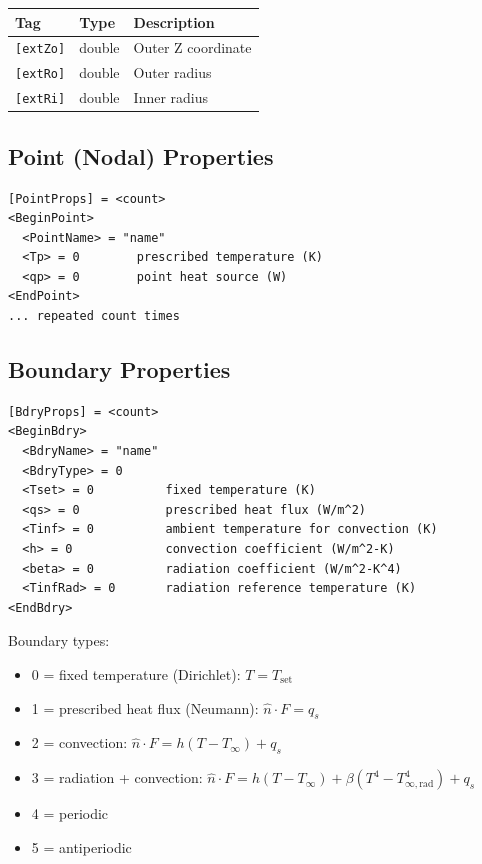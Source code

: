 \documentclass[11pt]{article}
\begin{document}
\begin{longtable}{llp{8cm}}
\toprule
Tag & Type & Description \\
\midrule
\verb|[extZo]| & double & Outer Z coordinate \\
\verb|[extRo]| & double & Outer radius \\
\verb|[extRi]| & double & Inner radius \\
\bottomrule
\end{longtable}

\subsection{Point (Nodal) Properties}

\begin{lstlisting}
[PointProps] = <count>
<BeginPoint>
  <PointName> = "name"
  <Tp> = 0        prescribed temperature (K)
  <qp> = 0        point heat source (W)
<EndPoint>
... repeated count times
\end{lstlisting}

\subsection{Boundary Properties}

\begin{lstlisting}
[BdryProps] = <count>
<BeginBdry>
  <BdryName> = "name"
  <BdryType> = 0
  <Tset> = 0          fixed temperature (K)
  <qs> = 0            prescribed heat flux (W/m^2)
  <Tinf> = 0          ambient temperature for convection (K)
  <h> = 0             convection coefficient (W/m^2-K)
  <beta> = 0          radiation coefficient (W/m^2-K^4)
  <TinfRad> = 0       radiation reference temperature (K)
<EndBdry>
\end{lstlisting}

Boundary types:
\begin{itemize}[nosep]
  \item 0 = fixed temperature (Dirichlet): $T = T_\text{set}$
  \item 1 = prescribed heat flux (Neumann): $\hat{n} \cdot F = q_s$
  \item 2 = convection: $\hat{n} \cdot F = h(T - T_\infty) + q_s$
  \item 3 = radiation + convection:
        $\hat{n} \cdot F = h(T - T_\infty) + \beta(T^4 - T_{\infty,\text{rad}}^4) + q_s$
  \item 4 = periodic
  \item 5 = antiperiodic
\end{itemize}
\end{document}
